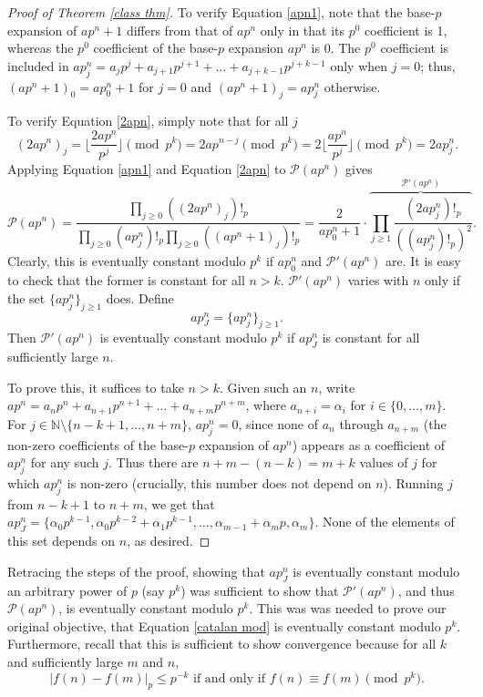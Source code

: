 \documentclass[12pt, letter]{article}    %
\theoremstyle{plain}
\theoremstyle{definition}
\numberwithin{equation}{section}
\newcommand{\thref}[1]{Theorem \ref{#1}}
\newcommand{\eref}[1]{Equation \ref{#1}}
\begin{document}
\begin{proof}[Proof of \thref{class thm}]
To verify \eref{apn1}, note that the base-$p$ expansion of $ap^n+1$ differs from that of $ap^n$ only in that its $p^0$ coefficient is 1, whereas the $p^0$ coefficient of the base-$p$ expansion $ap^n$ is 0. The $p^0$ coefficient is included in $ap^n_j=a_jp^j+a_{j+1}p^{j+1}+\dots+a_{j+k-1}p^{j+k-1}$ only when $j=0$; thus, $(ap^n+1)_0=ap^n_0+1$ for $j=0$ and $(ap^n+1)_j=ap^n_j$ otherwise. 

To verify \eref{2apn}, simply note that for all $j$
$$(2ap^n)_j=\lfloor\frac{2ap^n}{p^j}\rfloor\pmod{p^k}=2ap^{n-j}\pmod{p^k}=2\lfloor\frac{ap^n}{p^j}\rfloor\pmod{p^k}=2ap^n_j.$$
Applying \eref{apn1} and \eref{2apn} to $\mathcal{P}(ap^n)$ gives $$\mathcal{P}(ap^n)=\frac{\prod_{j\geq0}((2ap^n)_j)!_p}{\prod_{j\geq 0}(ap^n_j)!_p\prod_{j\geq 0}((ap^n+1)_j)!_p}=\frac{2}{ap^n_0+1}\cdot\overbrace{\prod_{j\geq1}\frac{(2ap^n_j)!_p}{((ap^n_j)!_p)^2}}^{\mathcal{P}'(ap^n)}.$$ 
Clearly, this is eventually constant modulo $p^k$ if $ap^n_0$ and $\mathcal{P}'(ap^n)$ are. It is easy to check that the former is constant for all $n>k$. $\mathcal{P}'(ap^n)$ varies with $n$ only if the set $\{ap^n_j\}_{j\geq1}$ does. Define
$$ap^n_J=\{ap^n_j\}_{j\geq1}.$$
Then $\mathcal{P}'(ap^n)$ is eventually constant modulo $p^k$ if $ap^n_J$ is constant for all sufficiently large $n$.

To prove this, it suffices to take $n>k$. Given such an $n$, write $ap^n=a_np^n+a_{n+1}p^{n+1}+\dots+a_{n+m}p^{n+m}$, where $a_{n+i}=\alpha_i$ for $i\in\{0,\dots,m\}$. For $j\in\mathbb{N}\setminus\{n-k+1,\dots,n+m\}$, $ap^n_j=0$, since none of $a_n$ through $a_{n+m}$ (the non-zero coefficients of the base-$p$ expansion of $ap^n$) appears as a coefficient of $ap^n_j$ for any such $j$. Thus there are $n+m-(n-k)=m+k$ values of $j$ for which $ap^n_j$ is non-zero (crucially, this number does not depend on $n$). Running $j$ from $n-k+1$ to $n+m$, we get that $ap^n_J=\{\alpha_0p^{k-1},\alpha_0p^{k-2}+\alpha_1p^{k-1},\dots,\alpha_{m-1}+\alpha_mp,\alpha_m\}$. None of the elements of this set depends on $n$, as desired. \end{proof}

Retracing the steps of the proof, showing that $ap^n_J$ is eventually constant modulo an arbitrary power of $p$ (say $p^k$) was sufficient to show that $\mathcal{P}'(ap^n)$, and thus $\mathcal{P}(ap^n)$, is eventually constant modulo $p^k$. This was was needed to prove our original objective, that \eref{catalan mod} is eventually constant modulo $p^k$. Furthermore, recall that this is sufficient to show convergence because for all $k$ and sufficiently large $m$ and $n$, 
$$|f(n)-f(m)|_p\leq p^{-k}\text{ if and only if } f(n)\equiv f(m)\pmod{p^k}.$$
\end{document}

